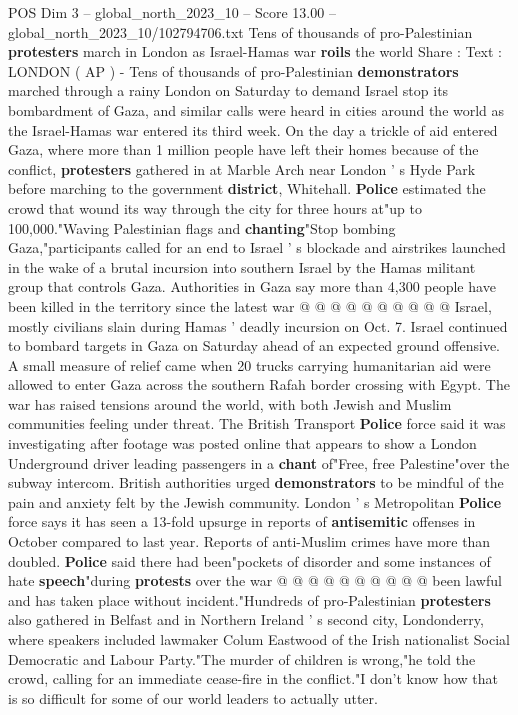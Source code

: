\begin{textsample}{POS Dim 3 – global\_north\_2023\_10 – Score 13.00 – global\_north\_2023\_10/102794706.txt}  \label{ex:f3_pos_272}
Tens of thousands of pro-Palestinian \textbf{protesters} march in London as Israel-Hamas war \textbf{roils} the world Share : Text : LONDON ( AP ) - Tens of thousands of pro-Palestinian \textbf{demonstrators} marched through a rainy London on Saturday to demand Israel stop its bombardment of Gaza, and similar calls were heard in cities around the world as the Israel-Hamas war entered its third week.
On the day a trickle of aid entered Gaza, where more than 1 million people have left their homes because of the conflict, \textbf{protesters} gathered in at Marble Arch near London ' s Hyde Park before marching to the government \textbf{district}, Whitehall. \textbf{Police} estimated the crowd that wound its way through the city for three hours at"up to 100,000."Waving Palestinian flags and \textbf{chanting}"Stop bombing Gaza,"participants called for an end to Israel ' s blockade and airstrikes launched in the wake of a brutal incursion into southern Israel by the Hamas militant group that controls Gaza.
Authorities in Gaza say more than 4,300 people have been killed in the territory since the latest war @ @ @ @ @ @ @ @ @ @ Israel, mostly civilians slain during Hamas ' deadly incursion on Oct. 7.
Israel continued to bombard targets in Gaza on Saturday ahead of an expected ground offensive.
A small measure of relief came when 20 trucks carrying humanitarian aid were allowed to enter Gaza across the southern Rafah border crossing with Egypt.
The war has raised tensions around the world, with both Jewish and Muslim communities feeling under threat.
The British Transport \textbf{Police} force said it was investigating after footage was posted online that appears to show a London Underground driver leading passengers in a \textbf{chant} of"Free, free Palestine"over the subway intercom.
British authorities urged \textbf{demonstrators} to be mindful of the pain and anxiety felt by the Jewish community.
London ' s Metropolitan \textbf{Police} force says it has seen a 13-fold upsurge in reports of \textbf{antisemitic} offenses in October compared to last year.
Reports of anti-Muslim crimes have more than doubled. \textbf{Police} said there had been"pockets of disorder and some instances of hate \textbf{speech}"during \textbf{protests} over the war @ @ @ @ @ @ @ @ @ @ been lawful and has taken place without incident."Hundreds of pro-Palestinian \textbf{protesters} also gathered in Belfast and in Northern Ireland ' s second city, Londonderry, where speakers included lawmaker Colum Eastwood of the Irish nationalist Social Democratic and Labour Party."The murder of children is wrong,"he told the crowd, calling for an immediate cease-fire in the conflict."I don't know how that is so difficult for some of our world leaders to actually utter.

\end{textsample}
